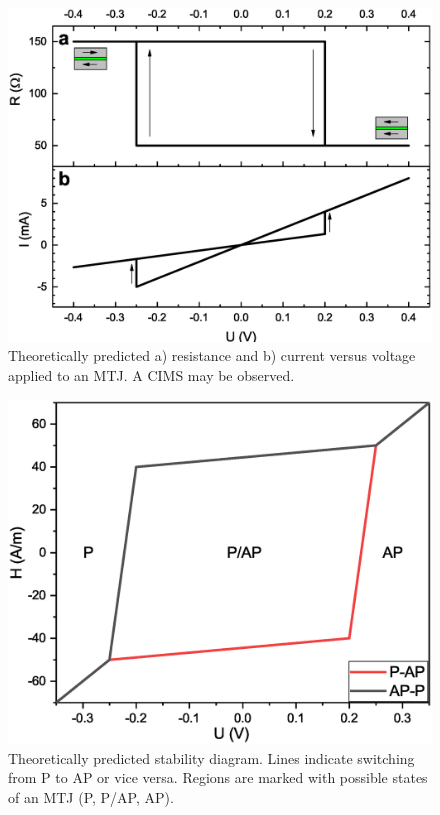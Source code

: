     \begin{figure}[H]
        \centering
        \includegraphics[width=0.75\paperwidth]{img/03/MTJ_characteristics_CIMS.eps}
        \caption{Theoretically predicted a) resistance and b) current versus voltage applied to an MTJ. A CIMS may be observed.}
        \label{PrinciplesMTJcims}
    \end{figure}
    
    \begin{figure}[H]
        \centering
        \includegraphics[width=0.75\paperwidth]{img/03/Eye_example.eps}
        \caption{Theoretically predicted stability diagram. Lines indicate switching from P to AP or vice versa. Regions are marked with possible states of an MTJ (P, P/AP, AP).}
        \label{PrinciplesEye}
    \end{figure}
    

